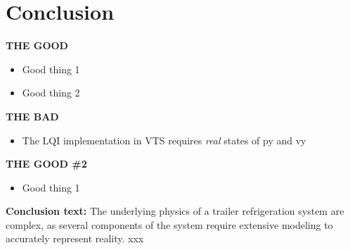 \section{Conclusion} \label{sec:concl}

\textbf{THE GOOD}

\begin{itemize}
	\item Good thing 1
	\item Good thing 2
\end{itemize}

\noindent \textbf{THE BAD}

\begin{itemize}
	\item The LQI implementation in VTS requires \textit{real} states of py and vy
\end{itemize}

\noindent \textbf{THE GOOD \#2}

\begin{itemize}
	\item Good thing 1
\end{itemize}

\textbf{Conclusion text:}
 The underlying physics of a trailer refrigeration system are complex, as several components of the system require extensive modeling to accurately represent reality. xxx












